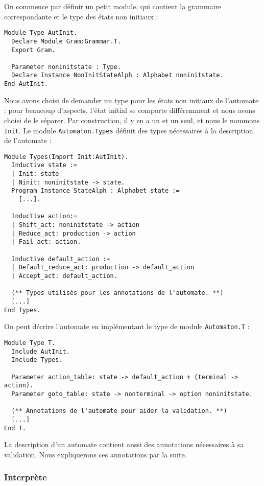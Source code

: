 \documentclass[a4paper,11pt]{article}
\begin{document}
On commence par définir un petit module, qui contient la grammaire
correspondante et le type des états non initiaux :

\begin{verbatim}
Module Type AutInit.
  Declare Module Gram:Grammar.T.
  Export Gram.

  Parameter noninitstate : Type.
  Declare Instance NonInitStateAlph : Alphabet noninitstate.
End AutInit.
\end{verbatim}

Nous avons choisi de demander un type pour les états non initiaux de
l'automate : pour beaucoup d'aspects, l'état initial se comporte
différemment et nous avons choisi de le séparer. Par construction,
il y en a un et un seul, et nous le nommons \verb+Init+. Le module
\verb+Automaton.Types+ définit des types nécessaires à la description
de l'automate :

\begin{verbatim}
Module Types(Import Init:AutInit).
  Inductive state :=
  | Init: state
  | Ninit: noninitstate -> state.
  Program Instance StateAlph : Alphabet state :=
    [...].

  Inductive action:=
  | Shift_act: noninitstate -> action
  | Reduce_act: production -> action
  | Fail_act: action.

  Inductive default_action :=
  | Default_reduce_act: production -> default_action
  | Accept_act: default_action.

  (** Types utilisés pour les annotations de l'automate. **)
  [...]
End Types.
\end{verbatim}

On peut décrire l'automate en implémentant le type de module
\verb+Automaton.T+ :

\begin{verbatim}
Module Type T.
  Include AutInit.
  Include Types.

  Parameter action_table: state -> default_action + (terminal -> action).
  Parameter goto_table: state -> nonterminal -> option noninitstate.

  (** Annotations de l'automate pour aider la validation. **)
  [...]
End T.
\end{verbatim}

La description d'un automate contient aussi des annotations nécessaires
à sa validation. Nous expliquerons ces annotations par la suite.

\subsubsection{Interprète}
\end{document}
